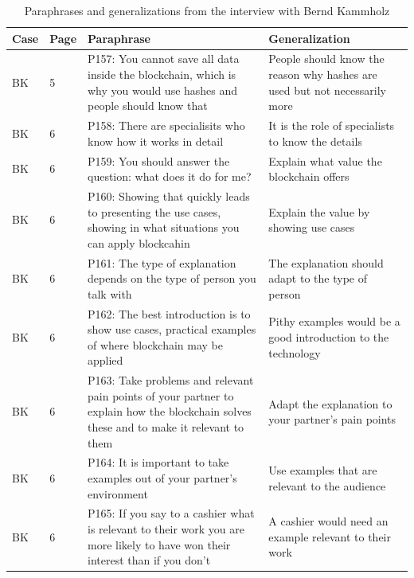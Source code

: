 \begin{table}[H]
    \centering
    \begin{tabularx}{\textwidth}{ll|X|p{4.5cm}}
	Case & Page & Paraphrase & Generalization \\ \hline
	BK & 5 & P157: You cannot save all data inside the blockchain, which is why you would use hashes and people should know that  & People should know the reason why hashes are used but not necessarily more \\  
	BK & 6 & P158: There are specialisits who know how it works in detail & It is the role of specialists to know the details \\  
	BK & 6 & P159: You should answer the question: what does it do for me? & Explain what value the blockchain offers \\  
	BK & 6 & P160: Showing that quickly leads to presenting the use cases, showing in what situations you can apply blockcahin & Explain the value by showing use cases \\  
	BK & 6 & P161: The type of explanation depends on the type of person you talk with & The explanation should adapt to the type of person \\  
	BK & 6 & P162: The best introduction is to show use cases, practical examples of where blockchain may be applied & Pithy examples would be a good introduction to the technology \\  
	BK & 6 & P163: Take problems and relevant pain points of your partner to explain how the blockchain solves these and to make it relevant to them & Adapt the explanation to your partner's pain points \\  
	BK & 6 & P164: It is important to take examples out of your partner's environment & Use examples that are relevant to the audience \\  
	BK & 6 & P165: If you say to a cashier what is relevant to their work you are more likely to have won their interest than if you don't & A cashier would need an example relevant to their work \\ 
\end{tabularx}
\caption{Paraphrases and generalizations from the interview with Bernd Kammholz}
\end{table}

